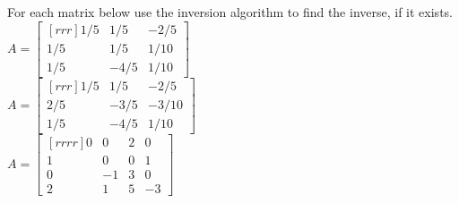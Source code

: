 \ii For each matrix below use the inversion algorithm to find the inverse, if it exists.
\vspace{.1in} \\
\bb
\ii $A=\begin{bmatrix}[rrr]
1/5&1/5&-2/5\\
1/5&1/5&1/10\\
1/5&-4/5&1/10\end{bmatrix}
$
\vspace{.1in} \\
\ii $A=\begin{bmatrix}[rrr]
1/5&1/5&-2/5\\
2/5&-3/5&-3/10\\
1/5&-4/5&1/10
\end{bmatrix}
$
\vspace{.1in} \\
\ii 
$A=\begin{bmatrix}[rrrr]
0&0&2&0\\
1&0&0&1\\
0&-1&3&0\\
2&1&5&-3
\end{bmatrix}
$
\vspace{.1in} \\
\ee
